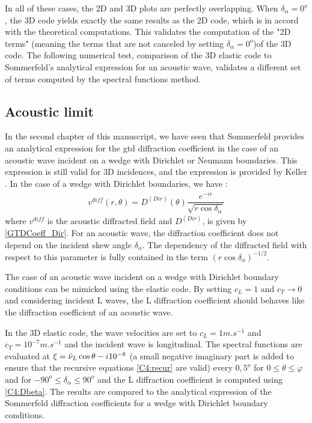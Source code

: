 In all of these cases, the 2D and 3D plots are perfectly overlapping. When $\delta_{\alpha}=0^o$, the 3D code yields exactly the same results as the 2D code, which is in accord with the theoretical computations. This validates the computation of the "2D terms" (meaning the terms that are not canceled by setting $\delta_{\alpha}=0^o$)of the 3D code. The following numerical test, comparison of the 3D elastic code to Sommerfeld's analytical expression for an acoustic wave, validates a different set of terms computed by the spectral functions method.

\subsection{Acoustic limit}
In the second chapter of this manuscript, we have seen that Sommerfeld \cite{Sommerfeld} provides an analytical expression for the \acrshort{gtd} diffraction coefficient in the case of an acoustic wave incident on a wedge with Dirichlet or Neumann boundaries. This expression is still valid for 3D incidences, and the expression is provided by Keller \cite{GTD}. In the case of a wedge with Dirichlet boundaries, we have :
\begin{equation}
\begin{split}
v^{diff}(r,\theta)=D^{(Dir)}(\theta)\dfrac{e^{-ir}}{\sqrt{r\cos\delta_{\alpha}}}
\end{split}
\end{equation}
where $v^{diff}$ is the acoustic diffracted field and $D^{(Dir)}$, is given by \eqref{GTDCoeff_Dir}. For an acoustic wave, the diffraction coefficient does not depend on the incident skew angle $\delta_{\alpha}$. The dependency of the diffracted field with respect to this parameter is fully contained in the term $(r\cos\delta_{\alpha})^{-1/2}$.

The case of an acoustic wave incident on a wedge with Dirichlet boundary conditions can be mimicked using the elastic code. By setting $c_L=1$ and $c_T \rightarrow 0$ and considering incident L waves, the L diffraction coefficient should behaves like the diffraction coefficient of an acoustic wave. 

In the 3D elastic code, the wave velocities are set to $c_L=1 m.s^{-1}$ and $c_T=10^{-7} m.s^{-1}$ and the incident wave is longitudinal. The spectral functions are evaluated at $\xi=\tilde{\nu}_L\cos\theta -i10^{-8}$ (a small negative imaginary part is added to ensure that the recursive equations \eqref{C4:recur} are valid) every $0,5^o$ for $0\leq\theta\leq \varphi$ and for $-90^o\leq \delta_{\alpha} \leq 90^o$ and the L diffraction coefficient is computed using \eqref{C4:Dbeta}. The results are compared to the analytical expression of the Sommerfeld diffraction coefficients for a wedge with Dirichlet boundary conditions.

